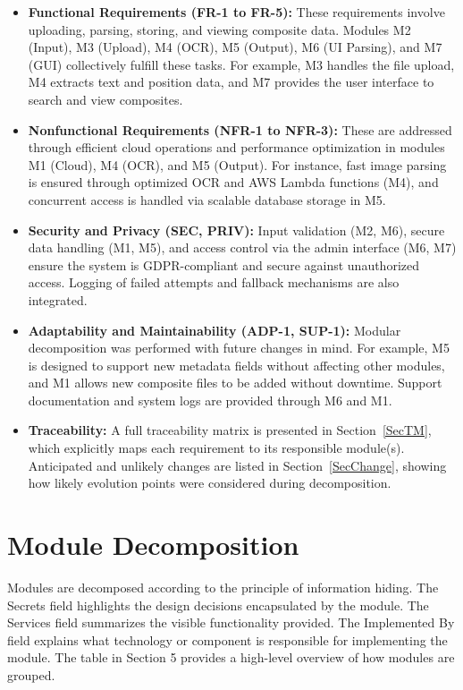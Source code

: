 \documentclass[12pt, titlepage]{article}
\begin{document}
\begin{itemize}
  \item \textbf{Functional Requirements (FR-1 to FR-5):} 
  These requirements involve uploading, parsing, storing, and viewing composite data. Modules M2 (Input), M3 (Upload), M4 (OCR), M5 (Output), M6 (UI Parsing), and M7 (GUI) collectively fulfill these tasks. For example, M3 handles the file upload, M4 extracts text and position data, and M7 provides the user interface to search and view composites.

  \item \textbf{Nonfunctional Requirements (NFR-1 to NFR-3):}
  These are addressed through efficient cloud operations and performance optimization in modules M1 (Cloud), M4 (OCR), and M5 (Output). For instance, fast image parsing is ensured through optimized OCR and AWS Lambda functions (M4), and concurrent access is handled via scalable database storage in M5.

  \item \textbf{Security and Privacy (SEC, PRIV):}
  Input validation (M2, M6), secure data handling (M1, M5), and access control via the admin interface (M6, M7) ensure the system is GDPR-compliant and secure against unauthorized access. Logging of failed attempts and fallback mechanisms are also integrated.

  \item \textbf{Adaptability and Maintainability (ADP-1, SUP-1):}
  Modular decomposition was performed with future changes in mind. For example, M5 is designed to support new metadata fields without affecting other modules, and M1 allows new composite files to be added without downtime. Support documentation and system logs are provided through M6 and M1.

  \item \textbf{Traceability:} 
  A full traceability matrix is presented in Section~\ref{SecTM}, which explicitly maps each requirement to its responsible module(s). Anticipated and unlikely changes are listed in Section~\ref{SecChange}, showing how likely evolution points were considered during decomposition.
\end{itemize}



\section{Module Decomposition}
\label{SecMD}
Modules are decomposed according to the principle of information hiding. The Secrets field highlights the design decisions encapsulated by the module. The Services field summarizes the visible functionality provided. The Implemented By field explains what technology or component is responsible for implementing the module. The table in Section 5 provides a high-level overview of how modules are grouped.
\end{document}
